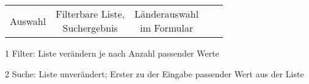 \begin{table}[!htb]
\begin{adjustbox}{max width=0.95\textwidth}
\begin{threeparttable}
\begin{tabular}{ l || c | c | c | c }
{                                                           Auswahl} & \tbbr{Filterbare Liste, \\ 
                                                                            Suchergebnis} & \tbbr{Länderauswahl \\ 
                                                                                                  im Formular} \\
            \end{tabular}
            \begin{tablenotes}
                \scriptsize
                \item[1] Filter: Liste verändern je nach Anzahl passender Werte
                \item[2] Suche: Liste unverändert; Erster zu der Eingabe passender Wert aus der Liste     
            \end{tablenotes}
        \end{threeparttable}
    \end{adjustbox}
\end{table}
